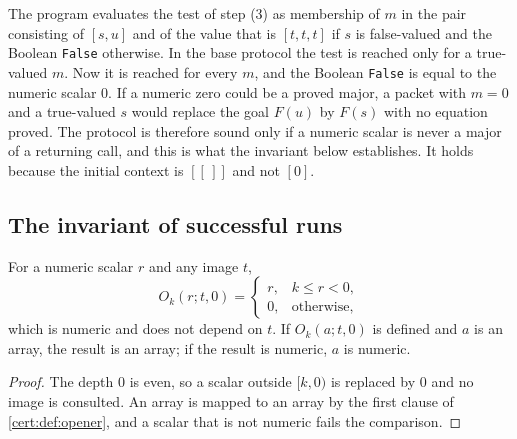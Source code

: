The program evaluates the test of step (3) as membership of $m$ in the pair
consisting of $[s,u]$ and of the value that is $[t,t,t]$ if $s$ is
false-valued and the Boolean \texttt{False} otherwise. In the base protocol
the test is reached only for a true-valued $m$. Now it is reached for every
$m$, and the Boolean \texttt{False} is equal to the numeric scalar $0$. If a
numeric zero could be a proved major, a packet with $m=0$ and a true-valued
$s$ would replace the goal $F(u)$ by $F(s)$ with no equation proved. The
protocol is therefore sound only if a numeric scalar is never a major of a
returning call, and this is what the invariant below establishes. It holds
because the initial context is $[[\,]]$ and not $[0]$.

\subsection{The invariant of successful runs}

\begin{lemma}\label{cert:lem:root}
For a numeric scalar $r$ and any image $t$,
\[
O_k(r;t,0)=\begin{cases}r,&k\le r<0,\\0,&\text{otherwise},\end{cases}
\]
which is numeric and does not depend on $t$. If $O_k(a;t,0)$ is defined and
$a$ is an array, the result is an array; if the result is numeric, $a$ is
numeric.
\end{lemma}
\begin{proof}
The depth $0$ is even, so a scalar outside $[k,0)$ is replaced by $0$ and no
image is consulted. An array is mapped to an array by the first clause of
\cref{cert:def:opener}, and a scalar that is not numeric fails the comparison.
\end{proof}


